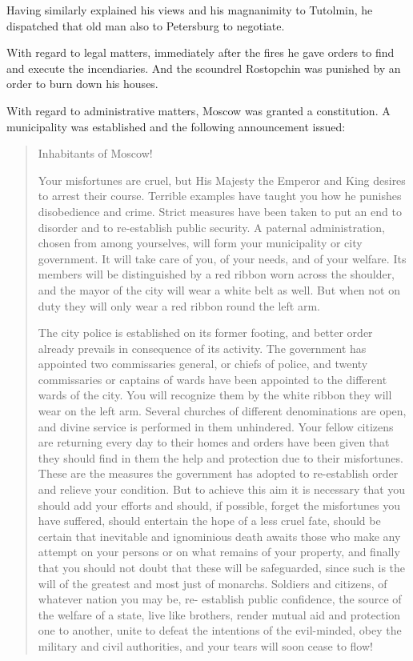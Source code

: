 Having similarly explained his views and his magnanimity to
Tutolmin, he dispatched that old man also to Petersburg to
negotiate.

With regard to legal matters, immediately after the fires he gave
orders to find and execute the incendiaries. And the scoundrel
Rostopchin was punished by an order to burn down his houses.

With regard to administrative matters, Moscow was granted a
constitution. A municipality was established and the following
announcement issued:

\begin{quote} Inhabitants of Moscow!

Your misfortunes are cruel, but His Majesty the Emperor and King
desires to arrest their course. Terrible examples have taught you
how he punishes disobedience and crime. Strict measures have been
taken to put an end to disorder and to re-establish public
security. A paternal administration, chosen from among
yourselves, will form your municipality or city government. It
will take care of you, of your needs, and of your welfare. Its
members will be distinguished by a red ribbon worn across the
shoulder, and the mayor of the city will wear a white belt as
well. But when not on duty they will only wear a red ribbon round
the left arm.

The city police is established on its former footing, and better
order already prevails in consequence of its activity. The
government has appointed two commissaries general, or chiefs of
police, and twenty commissaries or captains of wards have been
appointed to the different wards of the city. You will recognize
them by the white ribbon they will wear on the left arm. Several
churches of different denominations are open, and divine service
is performed in them unhindered. Your fellow citizens are
returning every day to their homes and orders have been given
that they should find in them the help and protection due to
their misfortunes. These are the measures the government has
adopted to re-establish order and relieve your condition. But to
achieve this aim it is necessary that you should add your efforts
and should, if possible, forget the misfortunes you have
suffered, should entertain the hope of a less cruel fate, should
be certain that inevitable and ignominious death awaits those who
make any attempt on your persons or on what remains of your
property, and finally that you should not doubt that these will
be safeguarded, since such is the will of the greatest and most
just of monarchs. Soldiers and citizens, of whatever nation you
may be, re- establish public confidence, the source of the
welfare of a state, live like brothers, render mutual aid and
protection one to another, unite to defeat the intentions of the
evil-minded, obey the military and civil authorities, and your
tears will soon cease to flow!  \end{quote}

